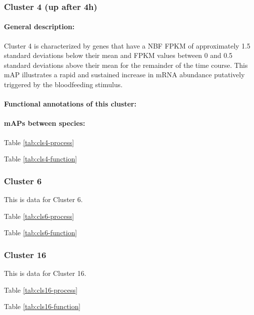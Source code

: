 \subsubsection{Cluster 4 (up after 4h)}

\paragraph*{General description:}

Cluster 4 is characterized by genes that have a \gls{NBF} \gls{FPKM} of approximately 1.5 standard deviations below their mean and \gls{FPKM} values between 0 and 0.5 standard deviations above their mean for the remainder of the time course.
%
This \gls{mAP} illustrates a rapid and sustained increase in mRNA abundance putatively triggered by the bloodfeeding stimulus.
%


\paragraph*{Functional annotations of this cluster:}



\paragraph*{\glspl{mAP} between species:}
\lipsum[3]


Table \ref{tab:cls4-process}

Table \ref{tab:cls4-function}
% 


\subsubsection{Cluster 6}

This is data for Cluster 6.



Table \ref{tab:cls6-process}

Table \ref{tab:cls6-function}
% 

\subsubsection{Cluster 16}

This is data for Cluster 16.



Table \ref{tab:cls16-process}

Table \ref{tab:cls16-function}
% 

